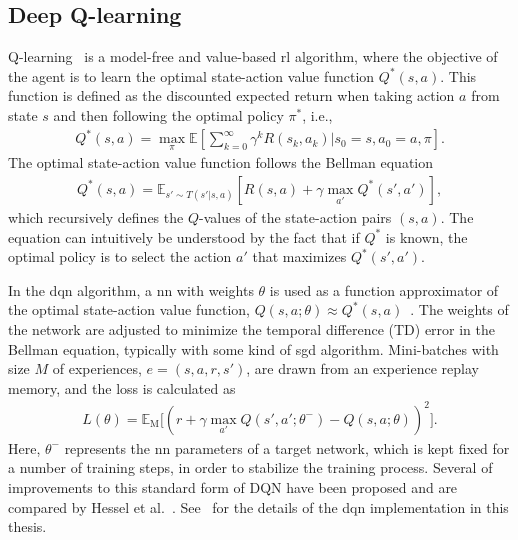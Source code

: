 \subsection{Deep Q-learning}
\label{ch:q-learning}
Q-learning~\cite{Watkins1992} is a model-free and value-based \gls{rl} algorithm, where the objective of the agent is to learn the optimal state-action value function $Q^*(s,a)$. This function is defined as the discounted expected return when taking action $a$ from state $s$ and then following the optimal policy $\pi^*$, i.e.,
%
\begin{align}
     Q^*(s,a) = \max_\pi \mathbb{E} \left[ \sum_{k=0}^\infty \gamma^k R(s_k, a_k) | s_0 = s, a_0 = a, \pi\right].
\end{align}
The optimal state-action value function follows the Bellman equation
\begin{align}
    Q^*(s,a) = \mathbb{E}_{s' \sim T(s'|s,a)}\left[R(s,a) + \gamma \max_{a'} Q^*(s',a')\right],
\end{align}
%
which recursively defines the $Q$-values of the state-action pairs $(s,a)$. The equation can intuitively be understood by the fact that if $Q^*$ is known, the optimal policy is to select the action $a'$ that maximizes $Q^*(s',a')$.

In the \gls{dqn} algorithm, a \gls{nn} with weights $\theta$ is used as a function approximator of the optimal state-action value function, $Q(s,a;\theta) \approx Q^*(s,a)$~\cite{Mnih2015}. The weights of the network are adjusted to minimize the temporal difference (TD) error in the Bellman equation, typically with some kind of \gls{sgd} algorithm. Mini-batches with size $M$ of experiences, $e=(s,a,r,s')$, are drawn from an experience replay memory, and the loss is calculated as
%
\begin{align}
    L(\theta) = \mathbb{E}_\mathrm{M} \Big[ (r + \gamma \max_{a'} Q(s',a';\theta^-)
    - Q(s,a;\theta) )^2 \Big].
    \label{eq:lossDQN}
\end{align}
%
Here, $\theta^-$ represents the \gls{nn} parameters of a target network, which is kept fixed for a number of training steps, in order to stabilize the training process. 
Several of improvements to this standard form of DQN have been proposed and are compared by Hessel et al.~\cite{Hessel2018}.
See \paperLSTM \ for the details of the \gls{dqn} implementation in this thesis.

